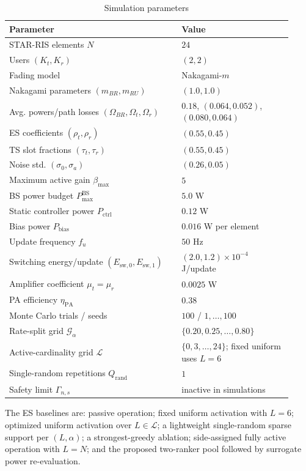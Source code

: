 \documentclass[journal]{IEEEtran}
\begin{document}
\begin{table}[H]
\caption{Simulation parameters}
\label{tab:params}
\centering
\scriptsize
\setlength{\tabcolsep}{2pt}
\begin{tabular}{@{}p{0.56\linewidth}p{0.36\linewidth}@{}}
\toprule
Parameter & Value \\
\midrule
STAR-RIS elements $N$ & $24$ \\
Users $(K_t,K_r)$ & $(2,2)$ \\
Fading model & Nakagami-$m$ \\
Nakagami parameters $(m_{BR},m_{RU})$ & $(1.0,1.0)$ \\
Avg. powers/path losses $(\Omega_{BR},\Omega_{t},\Omega_r)$ & $0.18$, $(0.064,0.052)$, $(0.080,0.064)$ \\
ES coefficients $(\rho_t,\rho_r)$ & $(0.55,0.45)$ \\ 
TS slot fractions $(\tau_t,\tau_r)$ & $(0.55,0.45)$ \\
Noise std. $(\sigma_0,\sigma_a)$ & $(0.26,0.05)$ \\
Maximum active gain $\beta_{\max}$ & $5$ \\
BS power budget $P_{\max}^{\mathrm{BS}}$ & $5.0$ W \\
Static controller power $P_{\mathrm{ctrl}}$ & $0.12$ W \\
Bias power $P_{\mathrm{bias}}$ & $0.016$ W per element \\
Update frequency $f_u$ & $50$ Hz \\
Switching energy/update $(E_{\mathrm{sw},0},E_{\mathrm{sw},1})$ & $(2.0,1.2)\times10^{-4}$ J/update \\
Amplifier coefficient $\mu_t=\mu_r$ & $0.0025$ W \\
PA efficiency $\eta_{\mathrm{PA}}$ & $0.38$ \\
Monte Carlo trials / seeds & $100$ / $1,\ldots,100$ \\
Rate-split grid $\mathcal{G}_\alpha$ & $\{0.20,0.25,\ldots,0.80\}$ \\
Active-cardinality grid $\mathcal{L}$ & $\{0,3,\ldots,24\}$; fixed uniform uses $L=6$ \\
Single-random repetitions $Q_{\mathrm{rand}}$ & $1$ \\
Safety limit $\Gamma_{n,s}$ & inactive in simulations \\
\bottomrule
\end{tabular}
\end{table}

The ES baselines are: passive operation; fixed uniform activation with $L=6$; optimized uniform activation over $L\in\mathcal{L}$; a lightweight single-random sparse support per $(L,\alpha)$; a strongest-greedy ablation; side-assigned fully active operation with $L=N$; and the proposed two-ranker pool followed by surrogate power re-evaluation.
\end{document}
